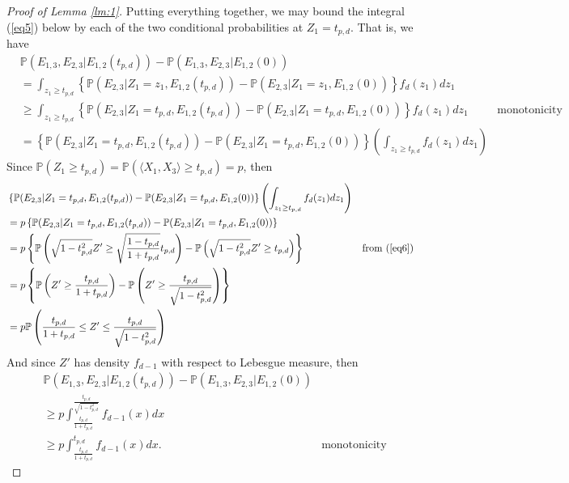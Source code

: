 \documentclass{article}
\begin{document}
\begin{proof}[Proof of Lemma \ref{lm:1}]
Putting everything together, we may bound the integral (\ref{eq5}) below by each of the two conditional probabilities at $Z_1 = t_{p,d}$. That is, we have
\begin{align*}
    &\mathbb{P}(E_{1,3}, E_{2,3} | E_{1,2}(t_{p,d})) - \mathbb{P}(E_{1,3},E_{2,3}| E_{1,2}(0))\\
    &= \int_{z_1 \geq t_{p, d}} \left\{ \mathbb{P} (E_{2,3} | Z_1 = z_1, E_{1,2}(t_{p,d}))  -  \mathbb{P} (E_{2,3} | Z_1 = z_1, E_{1,2}(0)) \right\} f_d(z_1) d z_1\\
    &\geq \int_{z_1 \geq t_{p, d}} \left\{ \mathbb{P} (E_{2,3} | Z_1 = t_{p,d}, E_{1,2}(t_{p,d}))  -  \mathbb{P} (E_{2,3} | Z_1 = t_{p,d}, E_{1,2}(0)) \right\} f_d(z_1) d z_1 & \text{monotonicity}\\
    &= \left\{ \mathbb{P} (E_{2,3} | Z_1 = t_{p,d}, E_{1,2}(t_{p,d}))  -  \mathbb{P} (E_{2,3} | Z_1 = t_{p,d}, E_{1,2}(0)) \right\} \left( \int_{z_1 \geq t_{p, d}} f_d(z_1) d z_1 \right)
\end{align*}
Since $\mathbb{P}(Z_1 \geq t_{p,d}) = \mathbb{P}(\langle X_1, X_3 \rangle \geq t_{p,d}) = p$, then 
\begin{align*}
    &\left\{ \mathbb{P} (E_{2,3} | Z_1 = t_{p,d}, E_{1,2}(t_{p,d}))  -  \mathbb{P} (E_{2,3} | Z_1 = t_{p,d}, E_{1,2}(0)) \right\} \left( \int_{z_1 \geq t_{p, d}} f_d(z_1) d z_1 \right)\\
    &= p \left\{ \mathbb{P} (E_{2,3} | Z_1 = t_{p,d}, E_{1,2}(t_{p,d}))  -  \mathbb{P} (E_{2,3} | Z_1 = t_{p,d}, E_{1,2}(0)) \right\}\\
    &= p \left\{ \mathbb{P} \left( \sqrt{1 - t_{p,d}^2} Z' \geq \sqrt{\frac{1-t_{p,d}}{1+t_{p,d}}} t_{p,d} \right)  -  \mathbb{P} \left( \sqrt{1 - t_{p,d}^2}Z' \geq t_{p,d} \right) \right\} & \text{from (\ref{eq6})}\\
    &= p \left\{ \mathbb{P} \left( Z' \geq \frac{t_{p,d}}{1 + t_{p,d}} \right)  -  \mathbb{P} \left(Z' \geq \frac{t_{p,d}}{ \sqrt{1 - t_{p,d}^2}} \right) \right\}\\
    &= p \mathbb{P}\left( \frac{t_{p,d}}{1 + t_{p,d}} \leq Z' \leq \frac{t_{p,d}}{ \sqrt{1 - t_{p,d}^2}}  \right) 
\end{align*}
And since $Z'$ has density $f_{d-1}$ with respect to Lebesgue measure, then 
\begin{align*}
    &\mathbb{P}(E_{1,3}, E_{2,3} | E_{1,2}(t_{p,d})) - \mathbb{P}(E_{1,3},E_{2,3}| E_{1,2}(0))\\
    &\geq p\int_{\frac{t_{p,d}}{1 + t_{p,d}}}^{\frac{t_{p,d}}{ \sqrt{1 - t_{p,d}^2}}} f_{d-1}(x) dx\\
    & \geq p\int_{\frac{t_{p,d}}{1 + t_{p,d}}}^{t_{p,d}} f_{d-1}(x) dx. & \text{monotonicity}
\end{align*}


\end{proof}
\end{document}
